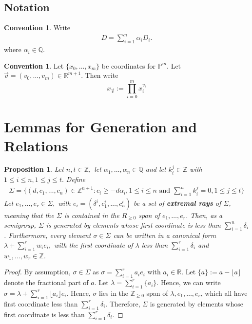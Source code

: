\documentclass{amsart}
\theoremstyle{plain}
\newtheorem{prop}[thm]{Proposition}
\theoremstyle{definition}
\newtheorem{convention}[thm]{Convention}
\theoremstyle{remark}
\numberwithin{equation}{section}
\newcommand\ssec{\subsection}
\newcommand\br{{\mathbb R}}
\newcommand\bq{{\mathbb Q}}
\newcommand\bp{{\mathbb P}}
\newcommand\bz{{\mathbb Z}}
\begin{document}
\ssec{Notation}
\begin{convention}
Write
\begin{align*}
	D = \sum_{i=1}^{n}\alpha_i D_i.
\end{align*}
where $\alpha_i \in \bq$.
\end{convention}

\begin{convention}
Let $\{x_0, \ldots, x_m\}$ be coordinates for $\bp^m$. Let
$\vec{v} = (v_0, \ldots, v_m) \in \br^{m + 1}$. Then write
\[
	x_{\vec{v}} := \prod_{i = 0}^{m} x_i^{v_i}
\]
\end{convention}

\section{Lemmas for Generation and Relations}

\begin{prop}
\label{prop:cone-generation}
Let $n,t \in \bz,$ let $\alpha_1, \ldots, \alpha_n \in \bq$ and let $k_i^j \in \bz$ with $1 \leq i \leq n, 1 \leq j \leq t.$ Define
\begin{align*}
	\Sigma = \{(d,c_1, \ldots, c_n) \in \bz^{n+1} : c_i \geq - d \alpha_i,1 \leq i \leq n \text{ and } \sum_{i=1}^{n}k_i^j = 0, 1 \leq j \leq t\}
\end{align*}
Let $e_1, \ldots, e_r \in \Sigma,$ with $e_i = (\delta^i, c_1^i, \ldots, c_n^i)$ be a set of {\bf extremal rays} of $\Sigma$, meaning that the $\Sigma$ is contained in the $R_{\geq 0}$ span of $e_1, \ldots, e_r$.  Then, as a semigroup, $\Sigma$ is generated by elements whose first coordinate is less than $\sum_{i=1}^{n}\delta_i$. Furthermore, every element $\sigma \in \Sigma$ can be written in a canonical form $\lambda + \sum_{i=1}^{r} w_i e_i,$ with the first coordinate of $\lambda$ less than $\sum_{i=1}^{r}\delta_i$ and $w_1,\ldots, w_r \in \bz$.
\end{prop}
\begin{proof}
By assumption, $\sigma \in \Sigma$ as $\sigma = \sum_{i=1}^{r}a_i e_i$ with $a_i \in \br$. Let $\{a\} := a - \lfloor a \rfloor$ denote the fractional part of $a$. Let $\lambda = \sum_{i=1}^{r}\{a_i\}$. Hence, we can write $\sigma = \lambda + \sum_{i=1}^{r}\lfloor a_i \rfloor e_i.$ Hence, $\sigma$ lies in the $\bz_{\geq 0}$ span of $\lambda, e_1,\ldots, e_r$, which all have first coordinate less than $\sum_{i=1}^{r}\delta_i$. Therefore, $\Sigma$ is generated by elements whose first coordinate is less than $\sum_{i=1}^{r}\delta_i$.
\end{proof}
\end{document}
